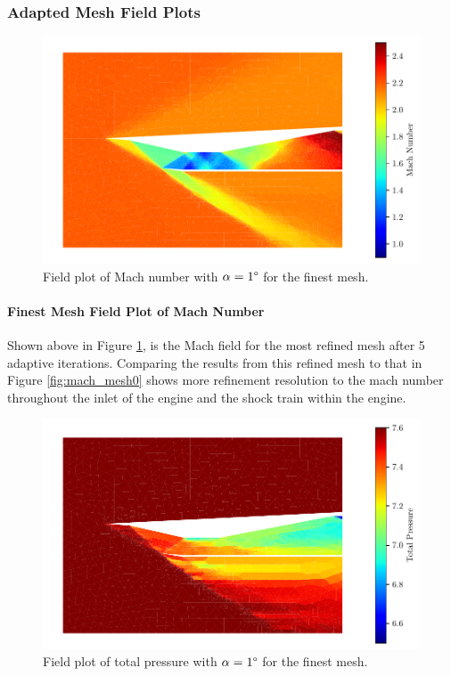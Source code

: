 \subsubsection{Adapted Mesh Field Plots}
\begin{figure}[h]
    \centering
    \includegraphics[width = 0.9\linewidth]{rep/q4/Machfield5.pdf}
    \caption[Field Plot of Mach Number for Adapted Mesh]{Field plot of Mach number with $\alpha = 1\degree$ for the finest mesh.}
    \label{fig:adapted_mach}
\end{figure}

\paragraph{Finest Mesh Field Plot of Mach Number} Shown above in Figure \ref{fig:adapted_mach}, is the Mach field for the most refined mesh after 5 adaptive iterations. Comparing the results from this refined mesh to that in Figure \ref{fig:mach_mesh0} shows more refinement resolution to the mach number throughout the inlet of the engine and the shock train within the engine.

\pagebreak
\begin{figure}[h]
    \centering
    \includegraphics[width = 0.9\linewidth]{rep/q4/Pfield5.pdf}
    \caption[Field Plot of Total Pressure for Adapted Mesh]{Field plot of total pressure with $\alpha = 1\degree$ for the finest mesh.}
    \label{fig:adapted_pt}
\end{figure}

